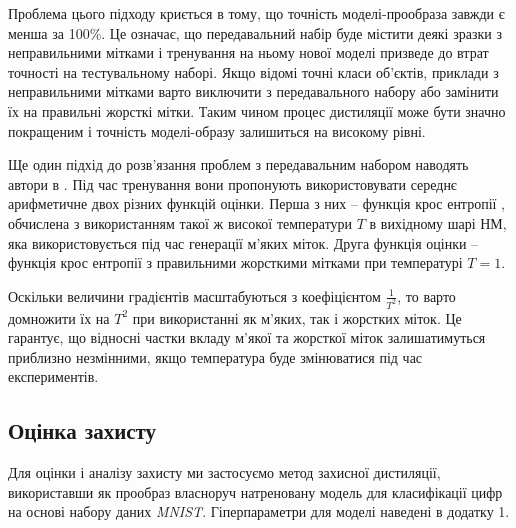 \documentclass[14pt,a4paper]{extarticle}
\newcounter{e}
\numberwithin{equation}{section}
\numberwithin{figure}{section}
\begin{document}
 Проблема цього підходу криється в тому, що точність моделі-прообраза завжди є менша за 100\%. Це означає, що передавальний набір буде містити деякі зразки з неправильними мітками і тренування на ньому нової моделі призведе до втрат точності на тестувальному наборі. Якщо відомі точні класи об'єктів, приклади з неправильними мітками варто виключити з передавального набору або замінити їх на правильні жорсткі мітки. Таким чином процес дистиляції може бути значно покращеним і точність моделі-образу залишиться на високому рівні.
 
 Ще один підхід до розв'язання проблем з передавальним набором наводять автори в \cite{distillation}. Під час тренування вони пропонують використовувати середнє арифметичне двох різних функцій оцінки. Перша з них -- функція крос ентропії 
 , обчислена з використанням такої ж високої температури $T$ в вихідному шарі НМ, яка використовується під час генерації м'яких міток. Друга функція оцінки -- функція крос ентропії з правильними жорсткими мітками при температурі $T=1$.
 
 
 Оскільки величини градієнтів масштабуються з коефіцієнтом $\frac{1}{T^2}$, то варто домножити їх на $T^2$ при використанні як м'яких, так і жорстких міток. Це гарантує, що відносні частки вкладу м'якої та жорсткої міток залишатимуться приблизно незмінними, якщо температура буде змінюватися під час експериментів.
 

 
 \subsection{Оцінка захисту}
 Для оцінки і аналізу захисту ми застосуємо метод захисної дистиляції, використавши як прообраз власноруч натреновану модель для класифікації цифр на основі набору даних \textit{MNIST}. Гіперпараметри для моделі наведені в додатку 1.
 
\end{document}
